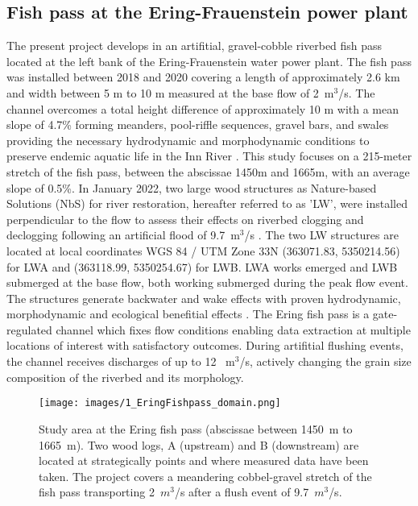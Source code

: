 \documentclass[draft,linenumbers,onecolumn]{agujournal2019} %
\begin{document}
\subsection{Fish pass at the Ering-Frauenstein power plant}
\label{sec:Sec2.1}
The present project develops in an artifitial, gravel-cobble riverbed fish pass located at the left bank of the Ering-Frauenstein water power plant. The fish pass was installed between 2018 and 2020 covering a length of approximately 2.6 km  and width between 5 m to 10 m measured at the base flow of  2~m$^3$/s. The channel overcomes a total height difference of approximately 10 m with a mean slope of 4.7\% forming meanders, pool-riffle sequences, gravel bars, and swales providing the necessary hydrodynamic and morphodynamic conditions to preserve endemic aquatic life in the Inn River \cite{schwindt2023fuzzylogic,zauner2020wie}. This study focuses on a 215-meter stretch of the fish pass, between the abscissae 1450m and 1665m, with an average slope of 0.5\%. In January 2022, two large wood structures as Nature-based Solutions (NbS) for river restoration, hereafter referred to as 'LW', were installed perpendicular to the flow to assess their effects on riverbed clogging and declogging following an artificial flood of 9.7~m$^3$/s  \cite{schwindt2023fuzzylogic}. The two LW structures are located at local coordinates WGS 84 / UTM Zone 33N (363071.83, 5350214.56) for LWA and (363118.99, 5350254.67) for LWB. LWA works emerged and LWB submerged at the base flow, both working submerged during the peak flow event. The structures generate backwater and wake effects with proven hydrodynamic, morphodynamic and ecological benefitial effects \cite{schalko2021flow,schwindt2023fuzzylogic}.    
The Ering fish pass is a gate-regulated channel which fixes flow conditions enabling data extraction at multiple locations of interest with satisfactory outcomes. During artifitial flushing events, the channel receives discharges of up to 12 ~m$^3$/s, actively changing the grain size composition of the riverbed and its morphology.


\begin{figure}[htbp]
	\centering
	\texttt{[image: images/1\_EringFishpass\_domain.png]}
	\caption{Study area  at the Ering fish pass (abscissae between 1450~m to 1665~m). Two wood logs, A (upstream) and B (downstream) are located at strategically points and where measured data have been taken. The project covers a meandering cobbel-gravel stretch of the fish pass transporting 2~$m^3$/s after a flush event of 9.7~$m^3$/s.   
	}
	\label{fig:StudyArea}
\end{figure}
\end{document}
